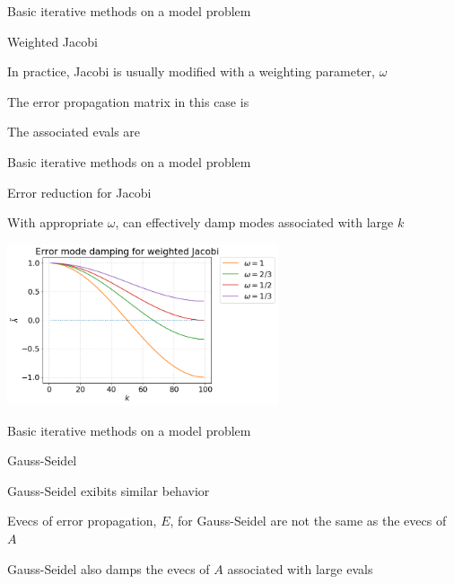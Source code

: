 \documentclass[18pt,xcolor=table]{beamer}
\begin{document}
\begin{frame}{Basic iterative methods on a model problem}
\begin{block}{Weighted Jacobi}
\bit
\item In practice, Jacobi is usually modified with a weighting parameter, $\omega$
\item The error propagation matrix in this case is
\item The associated evals are
\eit
\end{block}
\end{frame}

\begin{frame}{Basic iterative methods on a model problem}
\begin{center}
\begin{block}{Error reduction for Jacobi}
\bit
\item With appropriate $\omega$, can effectively damp modes associated with large $k$
\eit
\end{block}
\includegraphics[width=0.6\textwidth]{../figures/weightedJacobiModeDamping}
\end{center}
\end{frame}

\begin{frame}{Basic iterative methods on a model problem}
\begin{block}{Gauss-Seidel}
\bit
\item Gauss-Seidel exibits similar behavior
\item Evecs of error propagation, $E$, for Gauss-Seidel are not the same as the evecs of $A$
\item Gauss-Seidel also damps the evecs of $A$ associated with large evals
\eit
\end{block}
\end{frame}
\end{document}
